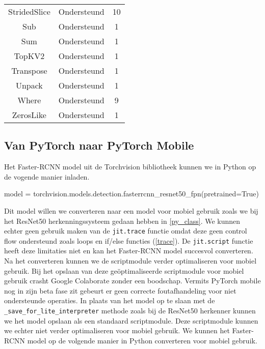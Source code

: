 \begin{table}[!ht]
\begin{tabular}{ccc}
    StridedSlice & Ondersteund & 10 \\
    Sub & Ondersteund & 1 \\
    Sum & Ondersteund & 1 \\
    TopKV2 & Ondersteund & 1 \\
    Transpose & Ondersteund & 1 \\
    Unpack & Ondersteund & 1 \\
    Where & Ondersteund & 9 \\
    ZerosLike & Ondersteund & 1 \\
    \hline
\end{tabular}
\label{tab:TF_det_op}
\end{table}

\subsection{Van PyTorch naar PyTorch Mobile}
Het Faster-RCNN model uit de Torchvision bibliotheek kunnen we in Python op de vogende manier inladen.

\begin{python}
model = torchvision.models.detection.fasterrcnn_resnet50_fpn(pretrained=True)
\end{python}

Dit model willen we converteren naar een model voor mobiel gebruik zoals we bij het ResNet50 herkenningssysteem gedaan hebben in \ref{py_class}. 
We kunnen echter geen gebruik maken van de \texttt{jit.trace} functie omdat deze geen control flow ondersteund zoals loops en if/else functies (\ref{trace}).
De \texttt{jit.script} functie heeft deze limitaties niet en kan het Faster-RCNN model succesvol converteren.
Na het converteren kunnen we de scriptmodule verder optimaliseren voor mobiel gebruik.
Bij het opslaan van deze ge\"optimaliseerde scriptmodule voor mobiel gebruik crasht Google Colaborate zonder een boodschap.
Vermits PyTorch mobile nog in zijn beta fase zit gebeurt er geen correcte foutafhandeling voor niet ondersteunde operaties.
In plaats van het model op te slaan met de \texttt{\_save\_for\_lite\_interpreter} methode zoals bij de ResNet50 herkenner kunnen we het model opslaan als een standaard scriptmodule.
Deze scriptmodule kunnen we echter niet verder optimaliseren voor mobiel gebruik.
We kunnen het Faster-RCNN model op de volgende manier in Python converteren voor mobiel gebruik.

